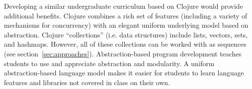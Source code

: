 \documentclass[submission,copyright,creativecommons]{eptcs}
\newcommand{\allcomments}[1]{{#1}}
\newcommand{\elenacomment}[1]{{\bf \textcolor{ForestGreen}{\allcomments{{#1}}}}}
\newcommand{\stephencomment}[1]{{\bf \color{StephensBlue}{\allcomments{{#1}}}}} %
\newcommand{\joecomment}[1]{{\bf \color{JoesGold}{\allcomments{{#1}}}}}
\begin{document}
Developing a similar undergraduate curriculum based on Clojure would provide additional benefits. 
Clojure combines a rich set of features (including a variety of mechanisms for concurrency) with an elegant uniform underlying model based on abstraction. Clojure ``collections'' (i.e. data structures) include lists, vectors, sets, and hashmaps. However, 
all of these collections can be worked with as sequences (see section~\ref{sec:approaches}). 
Abstraction-based program development teaches students to use and appreciate abstraction and modularity.%
A uniform abstraction-based language model makes it easier for students to learn language features and libraries not covered in class on their own. 
\end{document}
